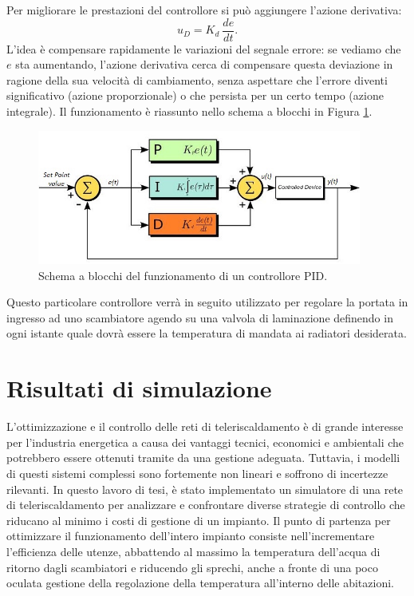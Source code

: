 \documentclass[laurea,oneside,11pt]{USiena_tesiLM3}
\begin{document}
Per migliorare le prestazioni del controllore si può aggiungere l'azione derivativa:
\begin{equation}
u_D = K_d \ \dfrac{de}{dt}  .
\end{equation}
L'idea è compensare rapidamente le variazioni del segnale errore: se vediamo che $e$ sta aumentando, l'azione derivativa cerca di compensare questa deviazione in ragione della sua velocità di cambiamento, senza aspettare che l'errore diventi significativo (azione proporzionale) o che persista per un certo tempo (azione integrale).
Il funzionamento è riassunto nello  schema a blocchi in Figura \ref{fig:PID2}.

\begin{figure}[!ht]
\centering
\includegraphics[width=0.95\textwidth]{figure/PID2} 
\caption{Schema a blocchi del funzionamento di un controllore PID.}
\label{fig:PID2}
\end{figure}

Questo particolare controllore verrà in seguito utilizzato per regolare la portata in ingresso ad uno scambiatore agendo su una valvola di laminazione definendo in ogni istante quale dovrà essere la temperatura di mandata ai radiatori desiderata.

\chapter{Risultati di simulazione}
L'ottimizzazione e il controllo delle reti di teleriscaldamento è di grande interesse per l'industria energetica a causa dei vantaggi tecnici, economici e ambientali che potrebbero essere ottenuti tramite da una gestione adeguata. Tuttavia, i modelli di questi sistemi complessi sono fortemente non lineari  e soffrono di incertezze rilevanti. In questo lavoro di tesi, è stato implementato un simulatore di una rete di teleriscaldamento per analizzare e confrontare diverse strategie di controllo che riducano al minimo i costi di gestione di un impianto.
Il punto di partenza per ottimizzare il funzionamento dell'intero impianto consiste nell'incrementare l'efficienza delle utenze, abbattendo al massimo la temperatura dell'acqua di ritorno dagli scambiatori 
e riducendo gli sprechi, anche a fronte di una poco oculata gestione della regolazione della temperatura all'interno delle abitazioni.
\end{document}
